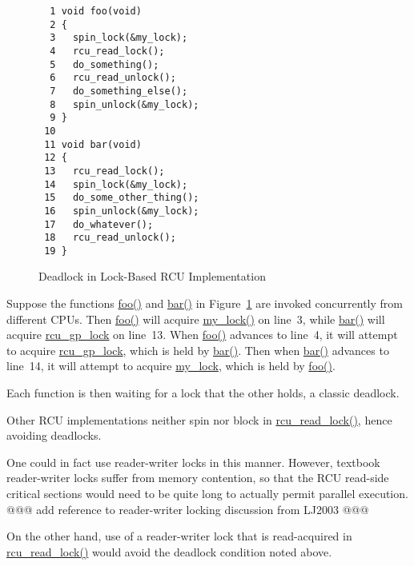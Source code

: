 

\begin{figure}[tbp]
{ \scriptsize
\begin{verbatim}
  1 void foo(void)
  2 {
  3   spin_lock(&my_lock);
  4   rcu_read_lock();
  5   do_something();
  6   rcu_read_unlock();
  7   do_something_else();
  8   spin_unlock(&my_lock);
  9 }
 10 
 11 void bar(void)
 12 {
 13   rcu_read_lock();
 14   spin_lock(&my_lock);
 15   do_some_other_thing();
 16   spin_unlock(&my_lock);
 17   do_whatever();
 18   rcu_read_unlock();
 19 }
\end{verbatim}
}
\caption{Deadlock in Lock-Based RCU Implementation}
\label{fig:defer:Deadlock in Lock-Based RCU Implementation}
\end{figure}

	Suppose the functions \url{foo()} and \url{bar()} in
	Figure~\ref{fig:defer:Deadlock in Lock-Based RCU Implementation}
	are invoked concurrently from different CPUs.
	Then \url{foo()} will acquire \url{my_lock()} on line~3,
	while \url{bar()} will acquire \url{rcu_gp_lock} on
	line~13.
	When \url{foo()} advances to line~4, it will attempt to
	acquire \url{rcu_gp_lock}, which is held by \url{bar()}.
	Then when \url{bar()} advances to line~14, it will attempt
	to acquire \url{my_lock}, which is held by \url{foo()}.

	Each function is then waiting for a lock that the other
	holds, a classic deadlock.

	Other RCU implementations neither spin nor block in
	\url{rcu_read_lock()}, hence avoiding deadlocks.


	One could in fact use reader-writer locks in this manner.
	However, textbook reader-writer locks suffer from memory
	contention, so that the RCU read-side critical sections would
	need to be quite long to actually permit parallel execution.
	@@@ add reference to reader-writer locking discussion from LJ2003 @@@

	On the other hand, use of a reader-writer lock that is
	read-acquired in \url{rcu_read_lock()} would avoid the
	deadlock condition noted above.


